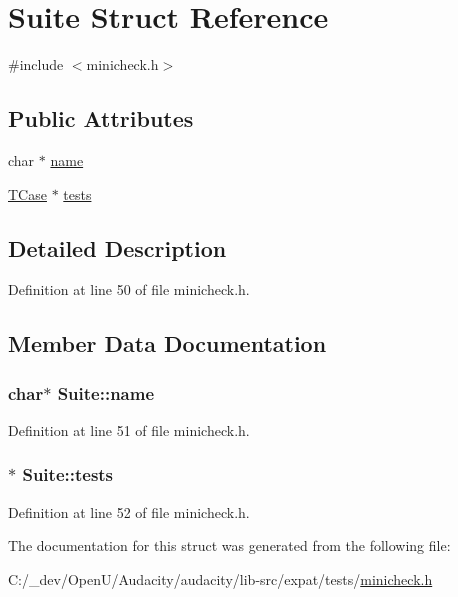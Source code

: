 \hypertarget{struct_suite}{}\section{Suite Struct Reference}
\label{struct_suite}


{\ttfamily \#include $<$minicheck.\+h$>$}

\subsection*{Public Attributes}
\begin{DoxyCompactItemize}
\item 
char $\ast$ \hyperlink{struct_suite_a440288d83bbf5b214d14f4379162f388}{name}
\item 
\hyperlink{struct_t_case}{T\+Case} $\ast$ \hyperlink{struct_suite_ab72ccee796b21f574ddbeb114b19e050}{tests}
\end{DoxyCompactItemize}


\subsection{Detailed Description}


Definition at line 50 of file minicheck.\+h.



\subsection{Member Data Documentation}
\subsubsection[{\texorpdfstring{name}{name}}]{\setlength{\rightskip}{0pt plus 5cm}char$\ast$ Suite\+::name}\hypertarget{struct_suite_a440288d83bbf5b214d14f4379162f388}{}\label{struct_suite_a440288d83bbf5b214d14f4379162f388}


Definition at line 51 of file minicheck.\+h.

\subsubsection[{\texorpdfstring{tests}{tests}}]{$\ast$ Suite\+::tests}\hypertarget{struct_suite_ab72ccee796b21f574ddbeb114b19e050}{}\label{struct_suite_ab72ccee796b21f574ddbeb114b19e050}


Definition at line 52 of file minicheck.\+h.



The documentation for this struct was generated from the following file\+:\begin{DoxyCompactItemize}
\item 
C\+:/\+\_\+dev/\+Open\+U/\+Audacity/audacity/lib-\/src/expat/tests/\hyperlink{minicheck_8h}{minicheck.\+h}\end{DoxyCompactItemize}
